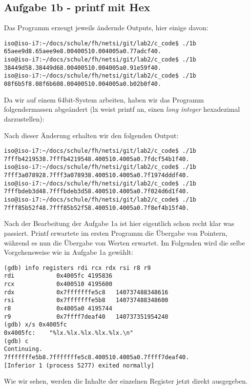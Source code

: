 \documentclass[a4paper,11pt,parskip=half]{scrartcl}
\begin{document}
\subsection{Aufgabe 1b - printf mit Hex}
Das Programm erzeugt jeweils ändernde Outputs, hier einige davon:
\begin{lstlisting}
iso@iso-i7:~/docs/schule/fh/netsi/git/lab2/c_code$ ./1b
65aee9d8.65aee9e8.00400510.004005a0.77adcf40.
iso@iso-i7:~/docs/schule/fh/netsi/git/lab2/c_code$ ./1b
38449d58.38449d68.00400510.004005a0.91e59f40.
iso@iso-i7:~/docs/schule/fh/netsi/git/lab2/c_code$ ./1b
08f6b5f8.08f6b608.00400510.004005a0.b02b0f40.
\end{lstlisting}

Da wir auf einem 64bit-System arbeiten, haben wir das Programm folgendermassen abgeändert (\glqq{}lx\grqq{} weist printf an, einen \emph{long integer} hexadezimal darzustellen):


Nach dieser Änderung erhalten wir den folgenden Output:
\begin{lstlisting}
iso@iso-i7:~/docs/schule/fh/netsi/git/lab2/c_code$ ./1b
7fffb4219538.7fffb4219548.400510.4005a0.7fdcf54b1f40.
iso@iso-i7:~/docs/schule/fh/netsi/git/lab2/c_code$ ./1b
7fff3a078928.7fff3a078938.400510.4005a0.7f1974dddf40.
iso@iso-i7:~/docs/schule/fh/netsi/git/lab2/c_code$ ./1b
7fffbdeb3d48.7fffbdeb3d58.400510.4005a0.7f024d6d1f40.
iso@iso-i7:~/docs/schule/fh/netsi/git/lab2/c_code$ ./1b
7fff85b52f48.7fff85b52f58.400510.4005a0.7f8ef4b15f40.
\end{lstlisting}

Nach der Bearbeitung der Aufgabe 1a ist hier eigentlich schon recht klar was passiert. Printf erwartete im ersten Programm die Übergabe von Pointern, während es nun die Übergabe von Werten erwartet. Im Folgenden wird die selbe Vorgehensweise wie in Aufgabe 1a gewählt:
\begin{lstlisting}
(gdb) info registers rdi rcx rdx rsi r8 r9
rdi            0x4005fc	4195836
rcx            0x400510	4195600
rdx            0x7fffffffe5c8	140737488348616
rsi            0x7fffffffe5b8	140737488348600
r8             0x4005a0	4195744
r9             0x7ffff7deaf40	140737351954240
(gdb) x/s 0x4005fc
0x4005fc:	 "%lx.%lx.%lx.%lx.%lx.\n"
(gdb) c
Continuing.
7fffffffe5b8.7fffffffe5c8.400510.4005a0.7ffff7deaf40.
[Inferior 1 (process 5277) exited normally]
\end{lstlisting}

Wie wir sehen, werden die Inhalte der einzelnen Register jetzt direkt ausgegeben.
\end{document}
